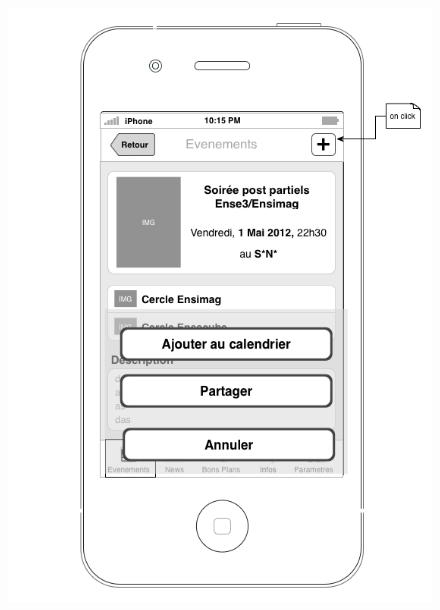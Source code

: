 \documentclass[a4paper, 11px]{article}
\begin{document}
\begin{figure}[htbp]
\begin{minipage}[c]{.50\linewidth}
\begin{center}
			\includegraphics[scale=0.3]{../../Sketch/iOS/evenements_detail_plus.png}
		\end{center}
	\end{minipage}
\end{figure}
\vfill
\clearpage

\vfill
\end{document}
